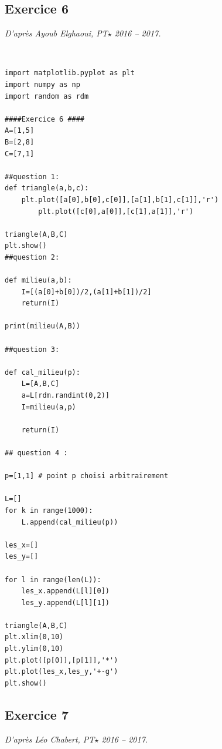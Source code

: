 \documentclass[10pt,fleqn]{article} %
\begin{document}
\subsection*{Exercice 6}
\textit{D'après Ayoub Elghaoui, PT$\star$ 2016 -- 2017.}

\begin{corrige}
$\quad$
\begin{lstlisting}
import matplotlib.pyplot as plt
import numpy as np
import random as rdm

####Exercice 6 ####
A=[1,5]
B=[2,8]
C=[7,1]

##question 1:
def triangle(a,b,c):
    plt.plot([a[0],b[0],c[0]],[a[1],b[1],c[1]],'r')
        plt.plot([c[0],a[0]],[c[1],a[1]],'r')

triangle(A,B,C)
plt.show()
##question 2:

def milieu(a,b):
    I=[(a[0]+b[0])/2,(a[1]+b[1])/2]
    return(I)

print(milieu(A,B))

##question 3:

def cal_milieu(p):
    L=[A,B,C]
    a=L[rdm.randint(0,2)]
    I=milieu(a,p)
    
    return(I)

## question 4 :

p=[1,1] # point p choisi arbitrairement

L=[]
for k in range(1000):
    L.append(cal_milieu(p))

les_x=[]
les_y=[]

for l in range(len(L)):
    les_x.append(L[l][0])
    les_y.append(L[l][1])

triangle(A,B,C)
plt.xlim(0,10)
plt.ylim(0,10)
plt.plot([p[0]],[p[1]],'*')
plt.plot(les_x,les_y,'+-g')
plt.show()
\end{lstlisting}
\end{corrige}

\subsection*{Exercice 7}
\textit{D'après Léo Chabert, PT$\star$ 2016 -- 2017.}
\end{document}
